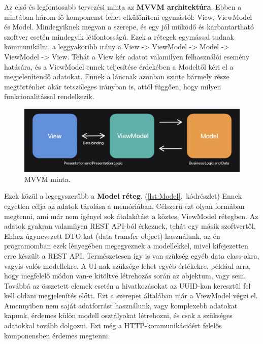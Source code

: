 Az első és legfontosabb tervezési minta az \textbf{MVVM architektúra}.  
Ebben a mintában három fő komponenst lehet elkülöníteni egymástól: View, ViewModel és Model.  
Mindegyiknek megvan a szerepe, és egy jól működő és karbantartható szoftver esetén mindegyik létfontosságú.  
Ezek a rétegek egymással tudnak kommunikálni, a leggyakoribb irány a View -> ViewModel -> Model -> ViewModel -> View.  
Tehát a View kér adatot valamilyen felhasználói esemény hatására, és a ViewModel ennek teljesítése érdekében a Modeltől kéri el a megjelenítendő adatokat.  
Ennek a láncnak azonban szinte bármely része megtörténhet akár tetszőleges irányban is, attól függően, hogy milyen funkcionalitással rendelkezik.

\begin{figure}[!ht]
    \centering
    \includegraphics[width=150mm, keepaspectratio]{figures/MVVM-architectural-pattern.png}
    \caption{MVVM minta. \cite{MVVMArchitecture}}
    \label{fig:MVVMArchitecture}
\end{figure}

Ezek közül a legegyszerűbb a \textbf{Model réteg}. (\ref{lst:Model}.~kódrészlet)  
Ennek egyetlen célja az adatok tárolása a memóriában.  
Célszerű ezt olyan formában megtenni, ami már nem igényel sok átalakítást a köztes, ViewModel rétegben.  
Az adatok gyakran valamilyen REST API-ból érkeznek, tehát egy másik szoftvertől.  
Ehhez úgynevezett DTO-kat (data transfer object) használunk, az én programomban ezek lényegében megegyeznek a modellekkel, mivel kifejezetten erre készült a REST API.  
Természetesen így is van szükség egyéb data class-okra, vagyis valós modellekre. A UI-nak szüksége lehet egyéb értékekre, például arra, hogy megfelelő módon van-e kitöltve létrehozás során az objektum, vagy sem.  
Továbbá az összetett elemek esetén a hivatkozásokat az UUID-kon keresztül fel kell oldani megjelenítés előtt. Ezt a szerepet általában már a ViewModel végzi el.  
Amennyiben nem saját adatforrást használunk, vagy komplexebb adatokat kapunk, érdemes külön modell osztályokat létrehozni, és csak a szükséges adatokkal tovább dolgozni.  
Ezt még a HTTP-kommunikációért felelős komponensben érdemes megtenni.

